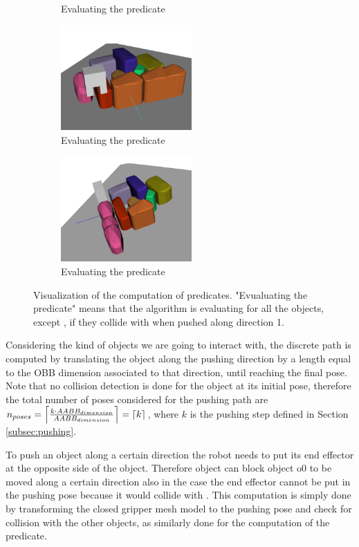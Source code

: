 \begin{figure}[tb]
\begin{subfigure}[t]{5cm}
\caption{Evaluating the  predicate}\label{fig:block_dir_original}
\end{subfigure}
\begin{subfigure}[t]{5cm}
\centering
\includegraphics[width=5cm]{Img/block_dir/pushing44.png}
\caption{Evaluating the  predicate}\label{fig:block_dir_original}
\end{subfigure}
\begin{subfigure}[t]{5cm}
\centering
\includegraphics[width=5cm]{Img/block_dir/pushing55.png}
\caption{Evaluating the  predicate}\label{fig:block_dir_original}
\end{subfigure}
\caption{Visualization of the computation of  predicates. "Evualuating the  predicate" means that the algorithm is evaluating for all the objects, except , if they collide with  when pushed along direction 1.}\label{fig:block_dir}
\end{figure}

Considering the kind of objects we are going to interact with, the discrete path  is computed by translating the object along the pushing direction by a length equal to the OBB dimension associated to that direction, until reaching the final pose. Note that no collision detection is done for the object at its initial pose, therefore the total number of poses considered for the pushing path are $n_{poses} = \ceil*{\frac{k \cdot AABB_{dimension}}{AABB_{dimension}}} = \ceil*{k}$, where $k$ is the pushing step defined in Section \ref{subsec:pushing}.

To push an object along a certain direction the robot needs to put its end effector at the opposite side of the object. Therefore object  can block object {o0} to be moved along a certain direction also in the case the end effector cannot be put in the pushing pose because it would collide with . This computation is simply done by transforming the closed gripper mesh model to the pushing pose and check for collision with the other objects, as similarly done for the computation of the  predicate.

